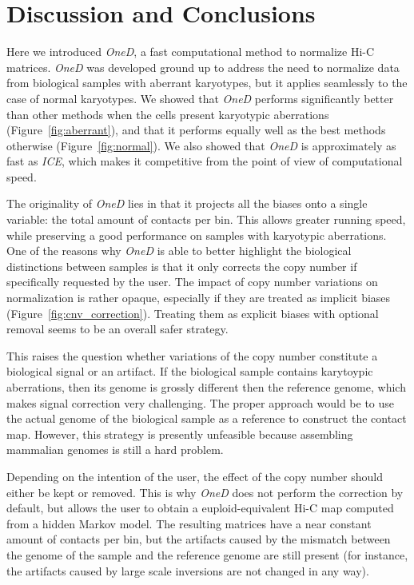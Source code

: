 \documentclass{bioinfo}
\begin{document}

\section{Discussion and Conclusions}

Here we introduced \textit{OneD}, a fast computational method to normalize
Hi-C matrices. \textit{OneD} was developed ground up to address the need
to normalize data from biological samples with aberrant karyotypes, but it
applies seamlessly to the case of normal karyotypes. We showed that
\textit{OneD} performs significantly better than other methods when the
cells present karyotypic aberrations (Figure~\ref{fig:aberrant}), and that
it performs equally well as the best methods otherwise
(Figure~\ref{fig:normal}). We also showed that \textit{OneD} is
approximately as fast as \textit{ICE}, which makes it competitive from the
point of view of computational speed.

The originality of \textit{OneD} lies in that it projects all the biases
onto a single variable: the total amount of contacts per bin. This allows
greater running speed, while preserving a good performance on samples with
karyotypic aberrations. One of the reasons why \textit{OneD} is able to better
highlight the biological distinctions between samples is that it only corrects
the copy number if specifically requested by the user. The impact of copy number
variations on normalization is rather opaque, especially if they are treated as
implicit biases (Figure~\ref{fig:cnv_correction}). Treating them as explicit
biases with optional removal seems to be an overall safer strategy.

This raises the question whether variations of the copy number constitute
a biological signal or an artifact. If the biological sample contains
karytoypic aberrations, then its genome is grossly different then the reference
genome, which makes signal correction very challenging. The proper approach
would be to use the actual genome of the biological sample as a reference to
construct the contact map. However, this strategy is presently unfeasible
because assembling mammalian genomes is still a hard problem.

Depending on the intention of the user, the effect of the copy number
should either be kept or removed. This is why \textit{OneD} does not
perform the correction by default, but allows the user to obtain a
euploid-equivalent Hi-C map computed from a hidden Markov model. The
resulting matrices have a near constant amount of contacts per bin, but
the artifacts caused by the mismatch between the genome of the sample and
the reference genome are still present (for instance, the artifacts caused
by large scale inversions are not changed in any way).
\end{document}
